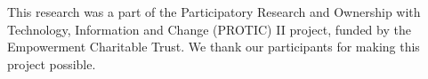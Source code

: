 \documentclass[sigconf]{acmart}
\begin{document}








\begin{acks}
This research was a part of the Participatory Research and Ownership with Technology, Information and Change (PROTIC) II project, funded by the Empowerment Charitable Trust. We thank our participants for making this project possible.
\end{acks}



\end{document}
